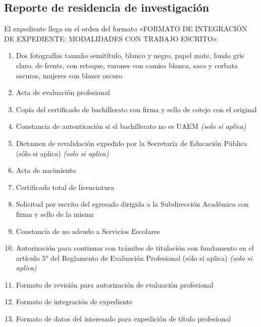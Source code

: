 \subsection{Reporte de residencia de investigación}
El expediente llega en el orden del formato «FORMATO DE INTEGRACIÓN DE EXPEDIENTE: MODALIDADES CON TRABAJO ESCRITO»:
\begin{enumerate}
  \item Dos fotografías tamaño semitítulo, blanco y negro, papel mate, fondo gris claro, de frente, con retoque, varones con camisa blanca, saco y corbata oscuros, mujeres con blazer oscuro
  \item Acta de evaluación profesional
  \item Copia del certificado de bachillerato con firma y sello de cotejo con el original
  \item Constancia de autenticación si el bachillerato no es UAEM \emph{(solo si aplica)}
  \item Dictamen de revalidación expedido por la Secretaría de Educación Pública (sólo si aplica) \emph{(solo si aplica)}
  \item Acta de nacimiento
  \item Certificado total de licenciatura
  \item Solicitud por escrito del egresado dirigida a la Subdirección Académica con firma y sello de la misma
  \item Constancia de no adeudo a Servicios Escolares
  \item Autorización para continuar con trámites de titulación con fundamento en el artículo 5° del Reglamento de Evaluación Profesional (sólo si aplica) \emph{(solo si aplica)}
  \item Formato de revisión para autorización de evaluación profesional
  \item Formato de integración de expediente
  \item Formato de datos del interesado para expedición de título profesional
\end{enumerate}
